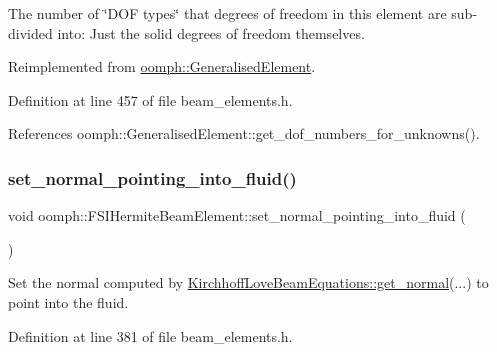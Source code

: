 The number of \char`\"{}\+D\+O\+F types\char`\"{} that degrees of freedom in this element are sub-\/divided into\+: Just the solid degrees of freedom themselves. 



Reimplemented from \hyperlink{classoomph_1_1GeneralisedElement_a0c6037a870597b35dcf1c780710b9a56}{oomph\+::\+Generalised\+Element}.



Definition at line 457 of file beam\+\_\+elements.\+h.



References oomph\+::\+Generalised\+Element\+::get\+\_\+dof\+\_\+numbers\+\_\+for\+\_\+unknowns().

\mbox{\label{classoomph_1_1FSIHermiteBeamElement_a6acb9e382d0cf3636848e7493c36a3a3}} 
\subsubsection{\texorpdfstring{set\+\_\+normal\+\_\+pointing\+\_\+into\+\_\+fluid()}{set\_normal\_pointing\_into\_fluid()}}
{\footnotesize\ttfamily void oomph\+::\+F\+S\+I\+Hermite\+Beam\+Element\+::set\+\_\+normal\+\_\+pointing\+\_\+into\+\_\+fluid (\begin{DoxyParamCaption}{ }\end{DoxyParamCaption})\hspace{0.3cm}{\ttfamily [inline]}}



Set the normal computed by \hyperlink{classoomph_1_1KirchhoffLoveBeamEquations_a963a2ffb3c4008e3b9c175fc1d2d94cc}{Kirchhoff\+Love\+Beam\+Equations\+::get\+\_\+normal}(...) to point into the fluid. 



Definition at line 381 of file beam\+\_\+elements.\+h.

\mbox{\label{classoomph_1_1FSIHermiteBeamElement_ad509b18e5fd5aae35a86f5c4372d3478}} 
